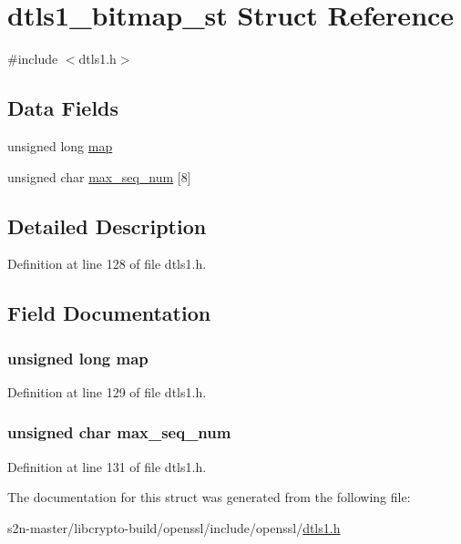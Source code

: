 \hypertarget{structdtls1__bitmap__st}{}\section{dtls1\+\_\+bitmap\+\_\+st Struct Reference}
\label{structdtls1__bitmap__st}


{\ttfamily \#include $<$dtls1.\+h$>$}

\subsection*{Data Fields}
\begin{DoxyCompactItemize}
\item 
unsigned long \hyperlink{structdtls1__bitmap__st_a46006db9519a065936120ab63310f8f4}{map}
\item 
unsigned char \hyperlink{structdtls1__bitmap__st_a0872dd39d7fd687e6c70f46ba4f78cb8}{max\+\_\+seq\+\_\+num} \mbox{[}8\mbox{]}
\end{DoxyCompactItemize}


\subsection{Detailed Description}


Definition at line 128 of file dtls1.\+h.



\subsection{Field Documentation}
\subsubsection[{\texorpdfstring{map}{map}}]{\setlength{\rightskip}{0pt plus 5cm}unsigned long map}\hypertarget{structdtls1__bitmap__st_a46006db9519a065936120ab63310f8f4}{}\label{structdtls1__bitmap__st_a46006db9519a065936120ab63310f8f4}


Definition at line 129 of file dtls1.\+h.

\subsubsection[{\texorpdfstring{max\+\_\+seq\+\_\+num}{max_seq_num}}]{\setlength{\rightskip}{0pt plus 5cm}unsigned char max\+\_\+seq\+\_\+num}\hypertarget{structdtls1__bitmap__st_a0872dd39d7fd687e6c70f46ba4f78cb8}{}\label{structdtls1__bitmap__st_a0872dd39d7fd687e6c70f46ba4f78cb8}


Definition at line 131 of file dtls1.\+h.



The documentation for this struct was generated from the following file\+:\begin{DoxyCompactItemize}
\item 
s2n-\/master/libcrypto-\/build/openssl/include/openssl/\hyperlink{include_2openssl_2dtls1_8h}{dtls1.\+h}\end{DoxyCompactItemize}
